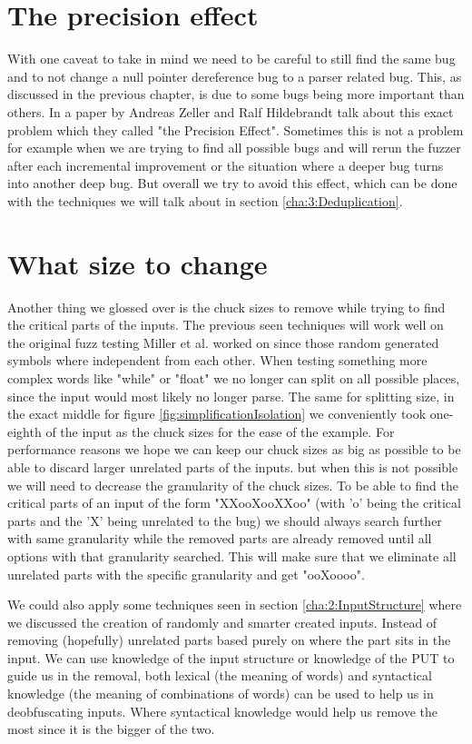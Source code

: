 \section{The precision effect}
\label{cha:3:PersisionEffect}
With one caveat to take in mind we need to be careful to still find the same bug and to not change a null pointer dereference bug to a parser related bug. This, as discussed in the previous chapter, is due to some bugs being more important than others. In a paper by Andreas Zeller and Ralf Hildebrandt \cite{5zeller2002simplifyingIsolatingFailure-inducing} talk about this exact problem which they called "the Precision Effect". Sometimes this is not a problem for example when we are trying to find all possible bugs and will rerun the fuzzer after each incremental improvement or the situation where a deeper bug turns into another deep bug. But overall we try to avoid this effect, which can be done with the techniques we will talk about in section \ref{cha:3:Deduplication}.
\section{What size to change}
\label{cha:3:Chucksize}
Another thing we glossed over is the chuck sizes to remove while trying to find the critical parts of the inputs. The previous seen techniques will work well on the original fuzz testing Miller et al.\cite{4originalFuzzingUnixUtils} worked on since those random generated symbols where independent from each other. When testing something more complex words like "while" or "float" we no longer can split on all possible places, since the input would most likely no longer parse. The same for splitting size, in the exact middle for figure \ref{fig:simplificationIsolation} we conveniently took one-eighth of the input as the chuck sizes for the ease of the example. For performance reasons we hope we can keep our chuck sizes as big as possible to be able to discard larger unrelated parts of the inputs. but when this is not possible we will need to decrease the granularity of the chuck sizes. To be able to find the critical parts of an input of the form "XXooXooXXoo" (with 'o' being the critical parts and the 'X' being unrelated to the bug) we should always search further with same granularity while the removed parts are already removed until all options with that granularity searched\cite{bookZellerwhyProgramsFail}. This will make sure that we eliminate all unrelated parts with the specific granularity and get "ooXoooo". 

We could also apply some techniques seen in section \ref{cha:2:InputStructure} where we discussed the creation of randomly and smarter created inputs. Instead of removing (hopefully) unrelated parts based purely on where the part sits in the input. We can use knowledge of the input structure or knowledge of the PUT to guide us in the removal\cite{bookZellerwhyProgramsFail}, both lexical (the meaning of words) and syntactical knowledge (the meaning of combinations of words) can be used to help us in deobfuscating inputs. Where syntactical knowledge would help us remove the most since it is the bigger of the two.

